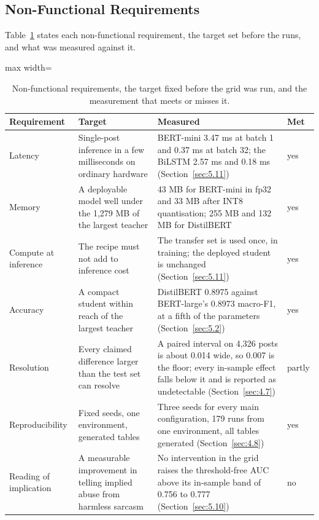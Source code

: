 \subsection{Non-Functional Requirements}
\label{sec:req.nonfunc}
Table~\ref{tab:requirements} states each non-functional requirement, the target set before the runs,
and what was measured against it.

\begin{table}[htbp]
\centering
\small
\caption[Non-functional requirements and what was measured]{Non-functional requirements, the target
fixed before the grid was run, and the measurement that meets or misses it.}
\label{tab:requirements}
\begin{adjustbox}{max width=\textwidth}
\begin{tabular}{p{2.6cm}p{4.3cm}p{4.9cm}p{1.5cm}}
\toprule
Requirement & Target & Measured & Met \\
\midrule
Latency & Single-post inference in a few milliseconds on ordinary hardware & BERT-mini 3.47 ms at batch
1 and 0.37 ms at batch 32; the BiLSTM 2.57 ms and 0.18 ms (Section~\ref{sec:5.11}) & yes \\
Memory & A deployable model well under the 1,279 MB of the largest teacher & 43 MB for BERT-mini in
fp32 and 33 MB after INT8 quantisation; 255 MB and 132 MB for DistilBERT & yes \\
Compute at inference & The recipe must not add to inference cost & The transfer set is used once, in
training; the deployed student is unchanged (Section~\ref{sec:5.11}) & yes \\
Accuracy & A compact student within reach of the largest teacher & DistilBERT 0.8975 against
BERT-large's 0.8973 macro-F1, at a fifth of the parameters (Section~\ref{sec:5.2}) & yes \\
Resolution & Every claimed difference larger than the test set can resolve & A paired interval on
4,326 posts is about 0.014 wide, so 0.007 is the floor; every in-sample effect falls below it and is
reported as undetectable (Section~\ref{sec:4.7}) & partly \\
Reproducibility & Fixed seeds, one environment, generated tables & Three seeds for every main
configuration, 179 runs from one environment, all tables generated
(Section~\ref{sec:4.8}) & yes \\
Reading of implication & A measurable improvement in telling implied abuse from harmless sarcasm &
No intervention in the grid raises the threshold-free AUC above its in-sample band of 0.756 to 0.777
(Section~\ref{sec:5.10}) & no \\
\bottomrule
\end{tabular}
\end{adjustbox}
\end{table}

